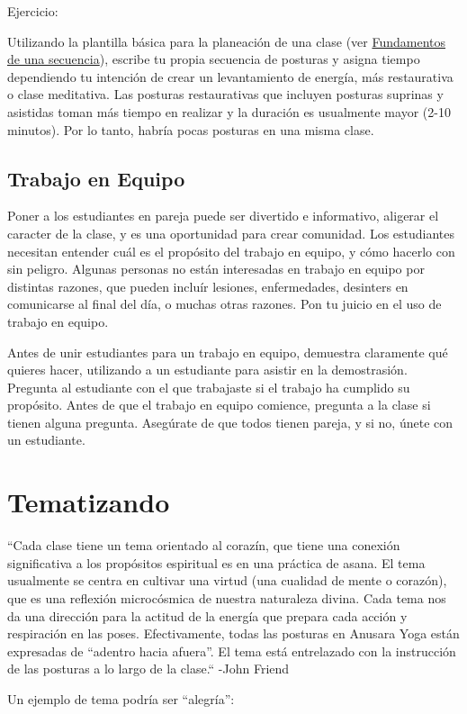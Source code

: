 Ejercicio:

Utilizando la plantilla básica para la planeación de una clase (ver \hyperref[sec:fundSec]{Fundamentos de una secuencia}), escribe tu propia secuencia de posturas y asigna tiempo dependiendo tu intención de crear un levantamiento de energía, más restaurativa o clase meditativa. Las posturas restaurativas que incluyen posturas suprinas y asistidas toman más tiempo en realizar y la duración es usualmente mayor (2-10 minutos). Por lo tanto, habría pocas posturas en una misma clase.

\subsection{Trabajo en Equipo}
Poner a los estudiantes en pareja puede ser divertido e informativo, aligerar el caracter de la clase, y es una oportunidad para crear comunidad. Los estudiantes necesitan entender cuál es el propósito del trabajo en equipo, y cómo hacerlo con sin peligro. Algunas personas no están interesadas en trabajo en equipo por distintas razones, que pueden incluír lesiones, enfermedades, desinters en comunicarse al final del día, o muchas otras razones. Pon tu juicio en el uso de trabajo en equipo.

Antes de unir estudiantes para un trabajo en equipo, demuestra claramente qu\'e quieres hacer, utilizando a un estudiante para asistir en la demostrasión. Pregunta al estudiante con el que trabajaste si el trabajo ha cumplido su propósito. Antes de que el trabajo en equipo comience, pregunta a la clase si tienen alguna pregunta. Asegúrate de que todos tienen pareja, y si no, únete con un estudiante.

\section{Tematizando}
``Cada clase tiene un tema orientado al corazín, que tiene una conexión significativa a los propósitos espiritual es en una práctica de asana. El tema usualmente se centra en cultivar una virtud (una cualidad de mente o corazón), que es una reflexión microcósmica de nuestra naturaleza divina. Cada tema nos da una dirección para la actitud de la energía que prepara cada acción y respiración en las poses. Efectivamente, todas las posturas en Anusara Yoga están expresadas de ``adentro hacia afuera''. El tema está entrelazado con la instrucción de las posturas a lo largo de la clase.``
-John Friend

Un ejemplo de tema podría ser ``alegría'':

